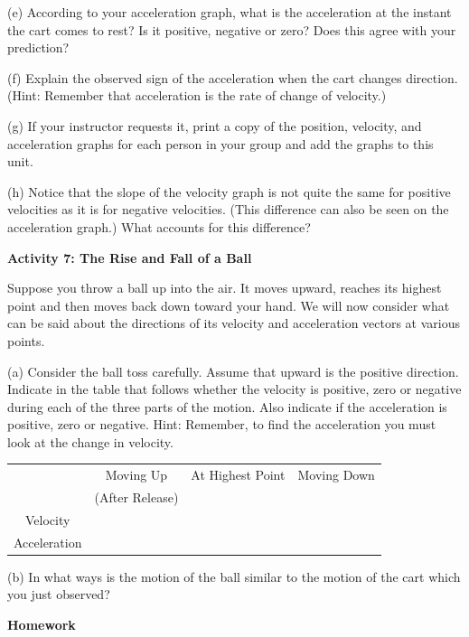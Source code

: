 (e) According to your acceleration graph, what is the acceleration at the instant
the cart comes to rest? Is it positive, negative or zero? Does this agree with
your prediction? 
\answerspace{20mm}

(f) Explain the observed sign of the acceleration when the cart changes direction. (Hint: Remember that acceleration is the rate of change of velocity.) 
\answerspace{20mm}

(g) If your instructor requests it, print a copy of the position, velocity, and acceleration graphs for each person in your group and add the graphs to this unit.

(h) Notice that the slope of the velocity graph is not quite the same for positive velocities as it is for negative velocities. (This difference can also be seen on the acceleration graph.) What accounts for this difference?
\answerspace{20mm}

\textbf{Activity 7: The Rise and Fall of a Ball} 

Suppose you throw a ball up into the air. It moves upward, reaches its highest
point and then moves back down toward your hand. We will now consider what can be said about the directions of its velocity and acceleration vectors at various points.

(a) Consider the ball toss carefully. Assume that upward is the positive direction.
Indicate in the table that follows whether the velocity is positive, zero or
negative during each of the three parts of the motion. Also indicate if the
acceleration is positive, zero or negative. Hint: Remember, to find the acceleration
you must look at the change in velocity.

\vspace{0.3cm}
{\centering \begin{tabular}{|c|c|c|c|}
\hline 
&
Moving Up&
At Highest Point&
Moving Down\\
&
(After Release)&
&
\\
\hline 
Velocity&
&
&
\\
\hline 
Acceleration&
&
&
\\
\hline 
\end{tabular}\par}
\vspace{0.3cm}

(b) In what ways is the motion of the ball similar to the motion of the cart
which you just observed?
\answerspace{10mm}

\pagebreak[3]
\textbf{Homework} 

